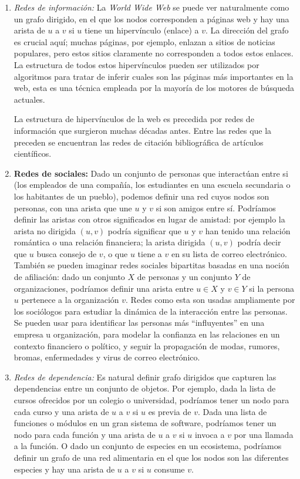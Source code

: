 \documentclass[a4paper, 12pt]{book}
\theoremstyle{dotless}
\begin{document}
\begin{enumerate}
\item \textit{Redes de información:}
La \textit{World Wide Web} se puede ver naturalmente como un grafo dirigido, en el que los nodos corresponden a páginas web y hay una arista de $u$ a $v$ si $u$ tiene un hipervínculo (enlace) a $v$. 
La dirección del grafo es crucial aquí; muchas páginas, por ejemplo, enlazan a sitios de noticias populares, pero estos sitios claramente no corresponden a todos estos enlaces. 
La estructura de todos estos hipervínculos pueden ser utilizados por algoritmos para tratar de inferir cuales son las páginas más importantes en la web, esta es una técnica empleada por la mayoría de los motores de búsqueda actuales.

La estructura de hipervínculos de la web es precedida por redes de información que surgieron muchas décadas antes. Entre las redes que la preceden se encuentran las redes de citación bibliográfica de artículos científicos.

\item \textbf{Redes de sociales:}
Dado un conjunto de personas que interactúan entre si (los empleados
de una compañía, los estudiantes en una escuela secundaria o los habitantes de un pueblo), podemos definir una red cuyos nodos son personas, con una arista que une $u$ y $v$ si son amigos entre sí. 
Podríamos definir las aristas con otros significados en lugar de amistad: por ejemplo la arista no dirigida $(u, v)$ podría significar que $u$ y $v$ han tenido una relación romántica o una relación financiera; 
la arista dirigida $(u, v)$ podría decir que $u$ busca consejo de $v$, o que $u$ tiene a $v$ en su lista de correo electrónico. 
También se pueden imaginar redes sociales bipartitas basadas en una noción de afiliación: dado un conjunto $X$ de personas y un conjunto $Y$ de organizaciones, podríamos definir una arista entre $u \in X$ y $v \in Y$ si la persona $u$ pertenece a la organización $v$.
Redes como esta son usadas ampliamente por los sociólogos para estudiar
la dinámica de la interacción entre las personas. 
Se pueden usar para identificar las personas más ``influyentes'' en una empresa u organización, para modelar la confianza en las relaciones en un contexto financiero o político, y seguir la propagación de modas, rumores, bromas, enfermedades y virus de correo electrónico.

\item \textit{Redes de dependencia:} 
Es natural definir grafo dirigidos que capturen las dependencias entre un conjunto de objetos. Por ejemplo, dada la lista de cursos ofrecidos por un colegio o universidad, podríamos tener un nodo para cada curso y una arista de $u$ a $v$ si $u$ es previa de $v$. Dada una lista de funciones o módulos en un gran sistema de software, podríamos tener un nodo para cada función y una arista de $u$ a $v$ si $u$ invoca a $v$ por una llamada a la función. O dado un conjunto de especies en un ecosistema, podríamos definir un grafo de una red alimentaria en el que los nodos son las diferentes especies y hay una arista de $u$ a $v$ si $u$ consume $v$.

\end{enumerate}
\end{document}
